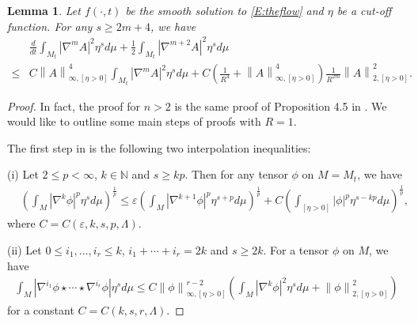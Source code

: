 \documentclass{amsart}
\newtheorem{lemma}[theorem]{Lemma}
\theoremstyle{definition}
\numberwithin{equation}{section}
\begin{document}
 \begin{lemma}\label{T:c2}Let $f(\cdot,t)$ be the smooth solution to  \eqref{E:theflow} and $\eta$ be a cut-off function.
  For any $s\geq 2m+4$, we have
 \begin{align*}
   &\frac{d}{dt} \int_{M_t}  \left| \nabla^{m} A \right|^{2} \eta^{s} d\mu + \frac{1}{2} \int_{M_t}  \left| \nabla^{m+2} A \right|^{2}  \eta^{s}
   d\mu \\
 \leq & C  \left\| A \right\|^{4}_{\infty, \left[  \eta >0\right]}     \int_{M_t} \left| \nabla^{m} A \right|^{2}
  \eta^{s} d\mu +C \left(  \frac 1{R^{4}} + \left\| A \right\|^{4}_{\infty, \left[  \eta >0\right]}  \right)\frac 1{R^{2m}}\left\| A
  \right\|^{2}_{2, \left[  \eta>0 \right]}  \mbox{.}
\end{align*}
 \end{lemma}
\begin{proof} In fact, the proof for $n>2$ is the same
proof of  Proposition 4.5   in \cite{KS1}. We would like to outline some main steps of proofs with $R=1$.

The  first step in \cite{KS1} is  the following two
interpolation inequalities:


(i) Let $2\leq p < \infty$, $k
\in \mathbb{N}$ and $s\geq kp$. Then for any tensor $\phi$ on $M=M_t$, we have
  \begin{align} \label{E:int0}
  &\left( \int_{M} \left| \nabla^{k} \phi \right|^{p} \eta^{s} d\mu \right)^{\frac{1}{p}} \leq \varepsilon \left( \int_{M} \left| \nabla^{k+1} \phi \right|^{p} \eta^{s+p} d\mu \right)^{\frac{1}{p}} +C \left( \int_{\left[
 \eta >0 \right]} \left| \phi \right|^{p} \eta^{s-kp} d\mu \right)^{\frac{1}{p}} \mbox{,}
\end{align}
where $C=C\left( \varepsilon, k, s, p, \Lambda \right)$.



 (ii)  Let $0 \leq i_{1}, \ldots, i_{r} \leq k$, $i_{1} + \cdots + i_{r} =2k$ and $s\geq 2k$.  For a tensor  $\phi$ on $M$, we have
 \begin{align} \label{5.28}
  \int_{M} \left| \nabla^{i_{1}} \phi \star \cdots \star \nabla^{i_{r}} \phi \right| \eta^{s} d\mu
    \leq C \left\| \phi \right\|^{r-2}_{\infty, \left[  \eta>0\right]} \left( \int_{M} \left| \nabla^{k} \phi \right|^{2} \eta^{s} d\mu +
    \left\| \phi \right\|^{2}_{2, \left[ \eta >0\right]} \right)
\end{align}
for a constant $C=C\left( k, s, r, \Lambda\right)$.




\end{proof}
\end{document}
